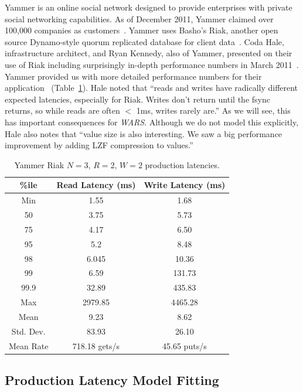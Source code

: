 \documentclass{vldb}
\begin{document}
Yammer is an online social network designed to provide enterprises
with private social networking capabilities.  As of December 2011,
Yammer claimed over 100,000 companies as customers~\cite{yammer}.
Yammer uses Basho's Riak, another open source Dynamo-style quorum
replicated database for client data~\cite{riak}.  Coda Hale,
infrastructure architect, and Ryan Kennedy, also of Yammer, presented
on their use of Riak including surprisingly in-depth performance
numbers in March 2011~\cite{riakyammer}.  Yammer provided us with more
detailed performance numbers for their application~\cite{codapc}
(Table~\ref{table:yammer}).  Hale noted that ``reads and writes have
radically different expected latencies, especially for Riak. Writes
don't return until the fsync returns, so while reads are often $<$
1ms, writes rarely are.''  As we will see, this has important
consequences for \textit{WARS}.  Although we do not model this
explicitly, Hale also notes that ``value size is also interesting. We
saw a big performance improvement by adding LZF compression to
values.''

\begin{table}
\centering
\begin{tabular}{|c|c|c|}
\hline
\%ile & Read Latency (ms) & Write Latency (ms)\\
\hline
Min & 1.55 & 1.68\\
50 & 3.75 & 5.73 \\
75 & 4.17 & 6.50\\
95 & 5.2 & 8.48\\
98 & 6.045 & 10.36 \\
99 & 6.59 & 131.73\\
99.9 & 32.89 & 435.83\\
Max & 2979.85 &  4465.28 \\
\hline
Mean & 9.23 & 8.62 \\
Std. Dev. & 83.93 & 26.10\\
\hline
Mean Rate & 718.18 gets/s & 45.65 puts/s\\
\hline
\end{tabular}
\caption{Yammer Riak $N$$=$$3$, $R$$=$$2$, $W$$=$$2$ production latencies.}
\label{table:yammer}
\end{table}

\subsection{Production Latency Model Fitting}
\end{document}
